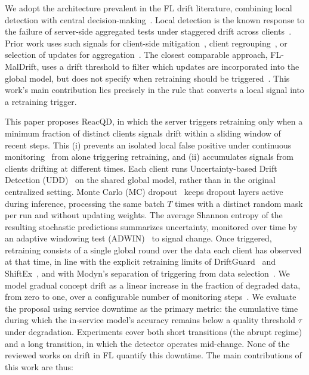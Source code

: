\documentclass[conference]{IEEEtran}
\begin{document}
We adopt the architecture prevalent in the FL drift literature, combining local detection with central decision-making~\cite{jothimurugesan2023,chow2023,mavromatis2024,patel2026,han2026,fu2025,zhou2026,casado2022,chen2026}. Local detection is the known response to the failure of server-side aggregated tests under staggered drift across clients~\cite{jothimurugesan2023}. Prior work uses such signals for client-side mitigation~\cite{chow2023,mavromatis2024}, client regrouping~\cite{fu2025,zhou2026}, or selection of updates for aggregation~\cite{patel2026}. The closest comparable approach, FL-MalDrift, uses a drift threshold to filter which updates are incorporated into the global model, but does not specify when retraining should be triggered~\cite{patel2026}. This work's main contribution lies precisely in the rule that converts a local signal into a retraining trigger.

This paper proposes ReacQD, in which the server triggers retraining only when a minimum fraction of distinct clients signals drift within a sliding window of recent steps. This (i) prevents an isolated local false positive under continuous monitoring~\cite{poenaru2022} from alone triggering retraining, and (ii) accumulates signals from clients drifting at different times. Each client runs Uncertainty-based Drift Detection (UDD)~\cite{baier2023} on the shared global model, rather than in the original centralized setting. Monte Carlo (MC) dropout~\cite{gal2016} keeps dropout layers active during inference, processing the same batch $T$ times with a distinct random mask per run and without updating weights. The average Shannon entropy of the resulting stochastic predictions summarizes uncertainty, monitored over time by an adaptive windowing test (ADWIN)~\cite{bifet2007} to signal change. Once triggered, retraining consists of a single global round over the data each client has observed at that time, in line with the explicit retraining limits of DriftGuard~\cite{han2026} and ShiftEx~\cite{bhope2025}, and with Modyn's separation of triggering from data selection~\cite{bother2025}. We model gradual concept drift as a linear increase in the fraction of degraded data, from zero to one, over a configurable number of monitoring steps~\cite{cerqueira2026}.
%
We evaluate the proposal using service downtime as the primary metric: the cumulative time during which the in-service model's accuracy remains below a quality threshold $\tau$ under degradation. Experiments cover both short transitions (the abrupt regime) and a long transition, in which the detector operates mid-change. None of the reviewed works on drift in FL quantify this downtime. The main contributions of this work are thus:
\end{document}
